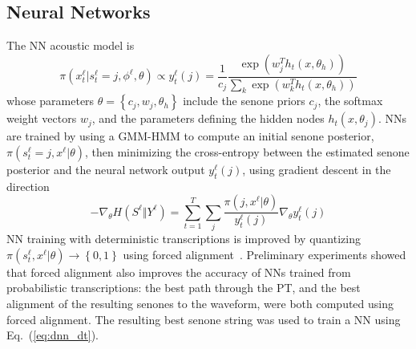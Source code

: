\subsection{Neural Networks}

The NN acoustic model is
\[
\pi(x_t^\ell|s_t^\ell =j,\phi^\ell,\theta)\propto
y_t^\ell(j)=\frac{1}{c_j}\frac{\exp\left(w_j^Th_t(x,\theta_h)\right)}
{\sum_k \exp\left(w_k^Th_t(x,\theta_h)\right)}
\]
whose parameters $\theta=\left\{c_j,w_j,\theta_h\right\}$ include the
senone priors $c_j$, the softmax weight vectors $w_j$, and the
parameters defining the hidden nodes $h_t(x,\theta_j)$.  NNs are
trained by using a GMM-HMM to compute an initial senone posterior,
$\pi(s_t^\ell=j,x^\ell|\theta)$, then minimizing the cross-entropy
between the estimated senone posterior and the neural network output
$y_{t}^\ell(j)$,
using gradient descent in the direction
\begin{equation}
  -\nabla_\theta H(S^\ell\Vert Y^\ell)=
  \sum_{t=1}^T\sum_j\frac{\pi(j,x^\ell|\theta)}{y_t^\ell(j)}
  \nabla_\theta y_t^\ell(j)
  \label{eq:dnn_dt}
\end{equation}
NN training with deterministic transcriptions is improved by
quantizing $\pi(s_t^\ell,x^\ell|\theta)\rightarrow\left\{0,1\right\}$
using forced alignment~\cite{Morgan95}. Preliminary experiments showed
that forced alignment also improves the accuracy of NNs trained from
probabilistic transcriptions: the best path through the PT, and the
best alignment of the resulting senones to the waveform, were both
computed using forced alignment.  The resulting best senone string was
used to train a NN using Eq.~(\ref{eq:dnn_dt}).

